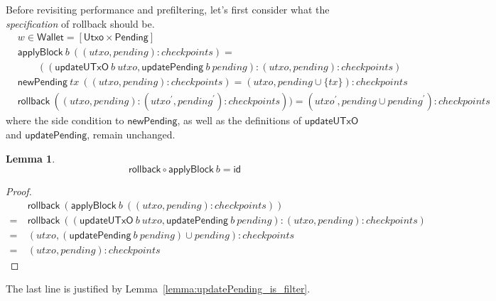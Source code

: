 \documentclass{article}
\newtheorem{lemma}{Lemma}
\begin{document}
Before revisiting performance and prefiltering, let's first consider what
the \emph{specification} of rollback should be.
%
\begin{align*}
& w \in \mathsf{Wallet} = [\mathsf{Utxo} \times \mathsf{Pending}] \\
& \mathsf{applyBlock} ~ b ~ ((\mathit{utxo}, \mathit{pending}) : \mathit{checkpoints}) = \\
& \qquad (( \mathsf{updateUTxO} ~ b ~ \mathit{utxo}
         , \mathsf{updatePending} ~ b ~ \mathit{pending}
         )
         : (\mathit{utxo}, \mathit{pending}) : \mathit{checkpoints}
         ) \\
& \mathsf{newPending} ~ tx ~ ((\mathit{utxo}, \mathit{pending}) : \mathit{checkpoints}) = (\mathit{utxo}, pending \cup \{ tx \} ) : \mathit{checkpoints} \\
& \mathsf{rollback} ~ ((\mathit{utxo}, \mathit{pending}) :  (\mathit{utxo}^\prime, \mathit{pending}^\prime) : \mathit{checkpoints})) =
     (\mathit{utxo}^\prime, \mathit{pending} \cup \mathit{pending}^\prime) : \mathit{checkpoints}
\end{align*}
%
where the side condition to $\mathsf{newPending}$, as well as the definitions
of $\mathsf{updateUTxO}$ and $\mathsf{updatePending}$, remain unchanged.

\begin{lemma}
\begin{equation*}
\mathsf{rollback} \circ \mathsf{applyBlock} ~ b = \mathsf{id}
\end{equation*}
\end{lemma}

\begin{proof}
\begin{align*}
    & \mathsf{rollback} ~ (\mathsf{applyBlock} ~ b ~ ((\mathit{utxo}, \mathit{pending}) : \mathit{checkpoints})) \\
= ~ & \mathsf{rollback} ~ (( \mathsf{updateUTxO} ~ b ~ \mathit{utxo}
         , \mathsf{updatePending} ~ b ~ \mathit{pending}
         )
         : (\mathit{utxo}, \mathit{pending}) : \mathit{checkpoints}
         ) \\
= ~ & (\mathit{utxo}, (\mathsf{updatePending} ~ b ~ \mathit{pending}) \cup \mathit{pending}) : \mathit{checkpoints} \\
= ~ & (\mathit{utxo}, \mathit{pending}) : \mathit{checkpoints}
\end{align*}
\end{proof}

The last line is justified by Lemma~\ref{lemma:updatePending_is_filter}.
\end{document}
